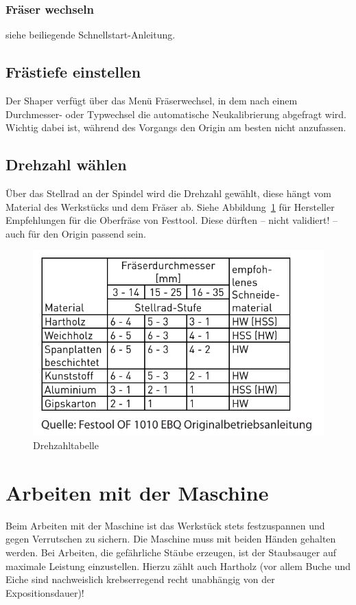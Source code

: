 \documentclass{\basedir/fablab-document}
\begin{document}
\subsubsection{Fräser wechseln}
siehe beiliegende Schnellstart-Anleitung.

\subsection{Frästiefe einstellen}
Der Shaper verfügt über das Menü Fräserwechsel, in dem nach einem Durchmesser-
oder Typwechsel die automatische Neukalibrierung abgefragt wird. Wichtig dabei
ist, während des Vorgangs den Origin am besten nicht anzufassen.

\subsection{Drehzahl wählen}
Über das Stellrad an der Spindel wird die Drehzahl gewählt, diese hängt vom
Material des Werkstücks und dem Fräser ab. Siehe Abbildung~\ref{fig:drehzahl}
für Hersteller Empfehlungen für die Oberfräse von Festtool. Diese dürften
-- nicht validiert! -- auch für den Origin passend sein.
\begin{figure}[h!]
    \centering
    \includegraphics{img/drehzahltabelle.pdf}
    \caption{Drehzahltabelle}
    \label{fig:drehzahl}
\end{figure}

\section{Arbeiten mit der Maschine}
Beim Arbeiten mit der Maschine ist das Werkstück stets festzuspannen
und gegen Verrutschen zu sichern. Die Maschine muss mit beiden Händen gehalten
werden. Bei Arbeiten, die gefährliche Stäube erzeugen, ist der Staubsauger
auf maximale Leistung einzustellen. Hierzu zählt auch Hartholz (vor allem
Buche und Eiche sind nachweislich krebserregend recht unabhängig von der Expositionsdauer)!
\end{document}
